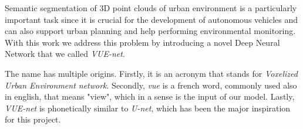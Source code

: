 Semantic segmentation of 3D point clouds of urban environment is a particularly important task 
since it is crucial for the development of autonomous 
vehicles and can also support urban planning and help performing environmental monitoring.
With this work we address this problem by introducing a novel Deep Neural Network that we called
\textit{VUE-net}.

The name has multiple origins. Firstly, it is an acronym that stands for \textit{Voxelized Urban Environment network}.
Secondly, \textit{vue} is a french word, commonly used also in english, that means "view", which in a sense is the input
of our model. Lastly, \textit{VUE-net} is phonetically similar to \textit{U-net}, which has been the major
inspiration for this project.
